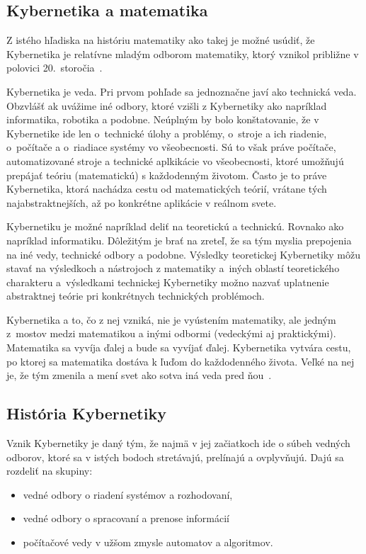 \documentclass[a4paper, 10pt, ]{article}
\begin{document}
\subsection{Kybernetika a matematika}

Z istého hľadiska na históriu matematiky ako takej je možné usúdiť, že Kybernetika je relatívne mladým odborom matematiky, ktorý vznikol približne v polovici 20.~storočia~\cite{Mares2008}.

Kybernetika je veda. Pri prvom pohľade sa jednoznačne javí ako technická veda. Obzvlášť ak uvážime iné odbory, ktoré vzišli z Kybernetiky ako napríklad informatika, robotika a podobne. Neúplným by bolo konštatovanie, že v Kybernetike ide len o~technické úlohy a problémy, o~stroje a ich riadenie, o~počítače a o~riadiace systémy vo všeobecnosti. Sú to však práve počítače, automatizované stroje a technické aplkikácie vo všeobecnosti, ktoré umožňujú prepájať teóriu (matematickú) s každodenným životom. Často je to práve Kybernetika, ktorá nachádza cestu od matematických teórií, vrátane tých najabstraktnejších, až po konkrétne aplikácie v reálnom svete. 

Kybernetiku je možné napríklad deliť na teoretickú a technickú. Rovnako ako napríklad informatiku. Dôležitým je brať na zreteľ, že sa tým myslia prepojenia na iné vedy, technické odbory a podobne. Výsledky teoretickej Kybernetiky môžu stavať na výsledkoch a nástrojoch z matematiky a~iných oblastí teoretického charakteru a~výsledkami technickej Kybernetiky možno nazvať uplatnenie abstraktnej teórie pri konkrétnych technických problémoch.

Kybernetika a to, čo z nej vzniká, nie je vyústením matematiky, ale jedným z~mostov medzi matematikou a inými odbormi (vedeckými aj praktickými). Matematika sa vyvíja ďalej a bude sa vyvíjať ďalej. Kybernetika vytvára cestu, po ktorej sa matematika dostáva k ľuďom do každodenného života. Veľké na nej je, že tým zmenila a mení svet ako sotva iná veda pred ňou~\cite{Mares2008}.



\subsection{História Kybernetiky}

Vznik Kybernetiky je daný tým, že najmä v jej začiatkoch ide o súbeh vedných odborov, ktoré sa v istých bodoch stretávajú, prelínajú a ovplyvňujú. Dajú sa rozdeliť na skupiny:
\begin{itemize}[leftmargin=0pt, labelsep=3mm, itemsep=0pt]
    \item vedné odbory o riadení systémov a rozhodovaní,
    \item vedné odbory o spracovaní a prenose informácií
    \item počítačové vedy v užšom zmysle automatov a algoritmov.
\end{itemize}
\end{document}
